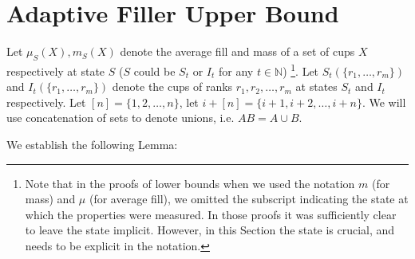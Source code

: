 \documentclass[twocolumn]{article}[10pt]
\begin{document}
\section{Adaptive Filler Upper Bound}\label{sec:adaptiveUpperBound}

Let $\mu_S(X), m_S(X)$ denote the average fill and mass of a set of cups $X$
respectively at state $S$ ($S$ could be $S_t$ or $I_t$ for any $t\in\mathbb{N}$)
\footnote{Note that in the proofs of lower bounds when we used the notation $m$
  (for mass) and $\mu$ (for average fill), we omitted the subscript
  indicating the state at which the properties were measured. 
  In those proofs it was sufficiently clear to leave the state implicit.
  However, in this Section the state is crucial, and needs to be explicit in the notation.}.
Let $S_t(\{r_1, \ldots, r_m\})$ and $I_t(\{r_1,\ldots, r_m\})$ denote the cups
of ranks $r_1, r_2, \ldots, r_m$ at states $S_t$ and $I_t$ respectively.
Let $[n] = \{1,2,\ldots, n\}$, let $i+[n] = \{i+1, i+2, \ldots, i+n\}$. We will
use concatenation of sets to denote unions, i.e. $AB = A\cup B$.

We establish the following Lemma:
\end{document}
